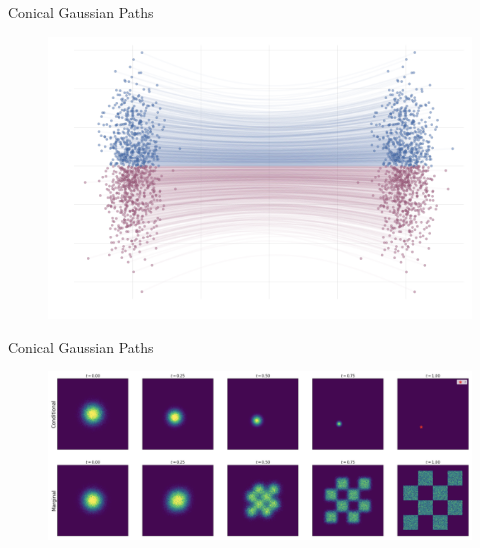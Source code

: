 \documentclass{beamer}
\begin{document}
\begin{frame}{Conical Gaussian Paths}
\begin{minipage}[t]{0.5\columnwidth}
		\end{minipage}%
		\begin{minipage}[t]{0.5\columnwidth}
			\begin{figure}
				\centering
				\includegraphics[width=\linewidth]{figs/g2g-forward_samples}
			\end{figure}
	\end{minipage}
\end{frame}
\begin{frame}{Conical Gaussian Paths}
	\begin{figure}
		\centering
		\includegraphics[width=\linewidth]{figs/cond_marg_paths}
	\end{figure}
\end{frame}
\end{document}
